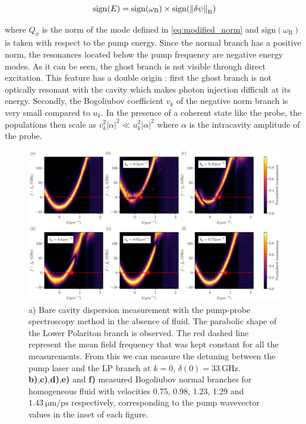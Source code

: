  \begin{equation}
    \mathrm{sign}(E)=\mathrm{sign}(\omega_\mathrm{B})\times \mathrm{sign}(\norm{\delta \psi}_\mathrm{B}) 
 \end{equation}
 
where $Q_{\phi}$ is the norm of the mode defined in \autoref{eq:modified_norm} and $\mathrm{sign}(\omega_\mathrm{B})$ is taken with respect to the pump energy. Since the normal branch has a positive norm, the resonances located
below the pump frequency are negative energy modes. As it can be seen, the ghost branch is not visible through direct excitation. This feature has a double origin : first the ghost branch is not optically resonant with the cavity which makes photon injection difficult at its energy. Secondly,
the Bogoliubov coefficient $v_k$ of the negative norm branch is very small compared to $u_k$.  In the presence of
a coherent state like the probe, the populations then scale as $v_k^2 |\alpha|^2\ll u_k^2|\alpha|^2$ where $\alpha$ is the intracavity amplitude of the probe. 

\begin{figure}[t!]
    \centering
    \includegraphics[width=1\textwidth]{chap_custom_st/fig/homogeneous_doppler.pdf}
    \caption{a) Bare cavity dispersion measurement with the pump-probe spectroscopy method in the absence of fluid. 
    The parabolic shape of the Lower Polariton branch is observed.  
    The red dashed line represent the mean field frequency that was kept constant for all the measurements. 
    From this we can measure the detuning between the pump laser and the LP branch at $k=0$,
     $\delta(0) = \SI{33}{\giga\hertz}$. \textbf{b)},\textbf{c)},\textbf{d)},\textbf{e)} and \textbf{f)} measured Bogoliubov normal branches for homogeneous fluid with velocities 0.75, 0.98, 1.23, 1.29 and $\SI{1.43}{\micro \meter \per \pico \second}$ respectively, corresponding 
    to the pump wavevector values in the inset of each figure.}
     
    \label{fig:homogeneous_fluid_bogo}
\end{figure}

